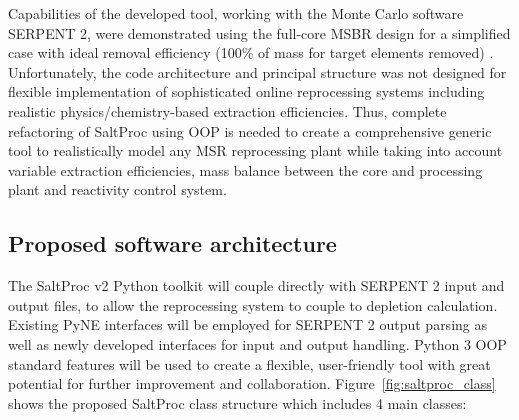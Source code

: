 Capabilities of the developed tool, working with the Monte Carlo software 
SERPENT 2, were demonstrated using the full-core MSBR design for a 
simplified case with ideal removal efficiency (100\% of mass for target 
elements removed) \cite{rykhlevskii_modeling_2019}. Unfortunately, 
the code architecture and principal structure was not designed for 
flexible implementation of sophisticated online reprocessing systems 
including realistic physics/chemistry-based extraction efficiencies. 
Thus, complete refactoring of SaltProc using \gls{OOP} is needed to 
create a comprehensive generic tool to realistically model any \gls{MSR} 
reprocessing plant while taking into account variable extraction 
efficiencies, mass balance between the core and processing plant and 
reactivity control system.

\subsection{Proposed software architecture}
The SaltProc v2 Python toolkit will couple directly with SERPENT 2 input 
and output files, 
to allow the reprocessing system to couple to depletion calculation. 
Existing PyNE interfaces will be employed for SERPENT 2 output parsing as 
well as newly developed interfaces for input and output handling. 
Python 3 \gls{OOP} 
standard features will be used to create a flexible, user-friendly tool with 
great potential for further improvement and collaboration. 
Figure~\ref{fig:saltproc_class} shows the proposed SaltProc class structure 
 which includes 4 main classes:
